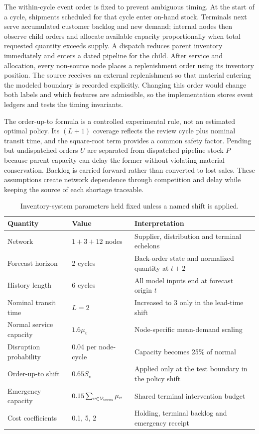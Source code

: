 \documentclass[11pt,a4paper]{article}
\begin{document}
The within-cycle event order is fixed to prevent ambiguous timing. At the start of a cycle, shipments scheduled for that cycle enter on-hand stock. Terminals next serve accumulated customer backlog and new demand; internal nodes then observe child orders and allocate available capacity proportionally when total requested quantity exceeds supply. A dispatch reduces parent inventory immediately and enters a dated pipeline for the child. After service and allocation, every non-source node places a replenishment order using its inventory position. The source receives an external replenishment so that material entering the modeled boundary is recorded explicitly. Changing this order would change both labels and which features are admissible, so the implementation stores event ledgers and tests the timing invariants.

The order-up-to formula is a controlled experimental rule, not an estimated optimal policy. Its $(L+1)$ coverage reflects the review cycle plus nominal transit time, and the square-root term provides a common safety factor. Pending but undispatched orders $U$ are separated from dispatched pipeline stock $P$ because parent capacity can delay the former without violating material conservation. Backlog is carried forward rather than converted to lost sales. These assumptions create network dependence through competition and delay while keeping the source of each shortage traceable.

\begin{table}[tb]\centering\small
\caption{Inventory-system parameters held fixed unless a named shift is applied.}\label{tab:system}
\begin{tabularx}{\linewidth}{p{.30\linewidth}p{.20\linewidth}Y}\toprule
Quantity & Value & Interpretation \\\midrule
Network & $1+3+12$ nodes & Supplier, distribution and terminal echelons \\
Forecast horizon & 2 cycles & Back-order state and normalized quantity at $t+2$ \\
History length & 6 cycles & All model inputs end at forecast origin $t$ \\
Nominal transit time & $L=2$ & Increased to 3 only in the lead-time shift \\
Normal service capacity & $1.6\mu_v$ & Node-specific mean-demand scaling \\
Disruption probability & 0.04 per node-cycle & Capacity becomes 25\% of normal \\
Order-up-to shift & $0.65S_v$ & Applied only at the test boundary in the policy shift \\
Emergency capacity & $0.15\sum_{v\in\mathcal V_{\rm term}}\mu_v$ & Shared terminal intervention budget \\
Cost coefficients & 0.1, 5, 2 & Holding, terminal backlog and emergency receipt \\
\bottomrule\end{tabularx}
\end{table}
\end{document}
